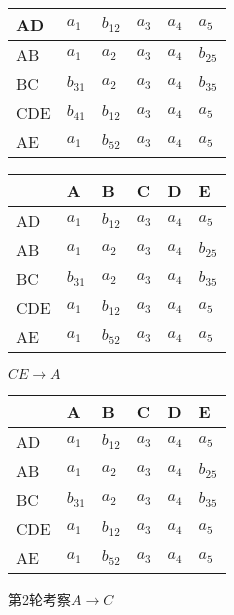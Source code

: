 \documentclass[10pt, a4paper]{article}
\begin{document}
\begin{enumerate}
\begin{enumerate}
\begin{figure}[H]
\begin{minipage}[b]{0.5\linewidth}
\begin{tabular}{|l|l|l|l|l|l|}
						AD  & $a_1$ & $b_{12}$ & $a_3$  & $a_4$  & $a_5$  \\ \hline
						AB  & $a_1$ & $a_2$  & $a_3$  & $a_4$ & $b_{25}$  \\ \hline
						BC  & $b_{31}$ &  $a_2$ & $a_3$ & $a_4$ & $b_{35}$ \\ \hline
						CDE & $b_{41}$ & $b_{12}$ & $a_3$ & $a_4$ & $a_5$ \\ \hline
						AE  & $a_1$ & $b_{52}$ & $a_3$ & $a_4$ & $a_5$ \\ \hline
						\end{tabular}
						\caption{$DE\to C$}\label{tab:5}
				\end{minipage}
				\begin{minipage}[b]{0.5\linewidth}
					\centering
					\begin{tabular}{|l|l|l|l|l|l|}
						\hline
							& A & B & C & D & E \\ \hline
						AD  & $a_1$ & $b_{12}$ & $a_3$  & $a_4$  & $a_5$  \\ \hline
						AB  & $a_1$ & $a_2$  & $a_3$  & $a_4$ & $b_{25}$  \\ \hline
						BC  & $b_{31}$ &  $a_2$ & $a_3$ & $a_4$ & $b_{35}$ \\ \hline
						CDE & $a_1$ & $b_{12}$ & $a_3$ & $a_4$ & $a_5$ \\ \hline
						AE  & $a_1$ & $b_{52}$ & $a_3$ & $a_4$ & $a_5$ \\ \hline
						\end{tabular}
						\caption{$CE\to A$}\label{tab:6}
				\end{minipage}
			\end{figure}
			\begin{figure}[H]
				\begin{minipage}[b]{0.5\linewidth}
					\centering
					\begin{tabular}{|l|l|l|l|l|l|}
						\hline
							& A & B & C & D & E \\ \hline
						AD  & $a_1$ & $b_{12}$ & $a_3$  & $a_4$  & $a_5$  \\ \hline
						AB  & $a_1$ & $a_2$  & $a_3$  & $a_4$ & $b_{25}$  \\ \hline
						BC  & $b_{31}$ &  $a_2$ & $a_3$ & $a_4$ & $b_{35}$ \\ \hline
						CDE & $a_1$ & $b_{12}$ & $a_3$ & $a_4$ & $a_5$ \\ \hline
						AE  & $a_1$ & $b_{52}$ & $a_3$ & $a_4$ & $a_5$ \\ \hline
						\end{tabular}
						\caption{第2轮考察$A\to C$}\label{tab:7}

\end{minipage}
\end{figure}
\end{enumerate}
\end{enumerate}
\end{document}
